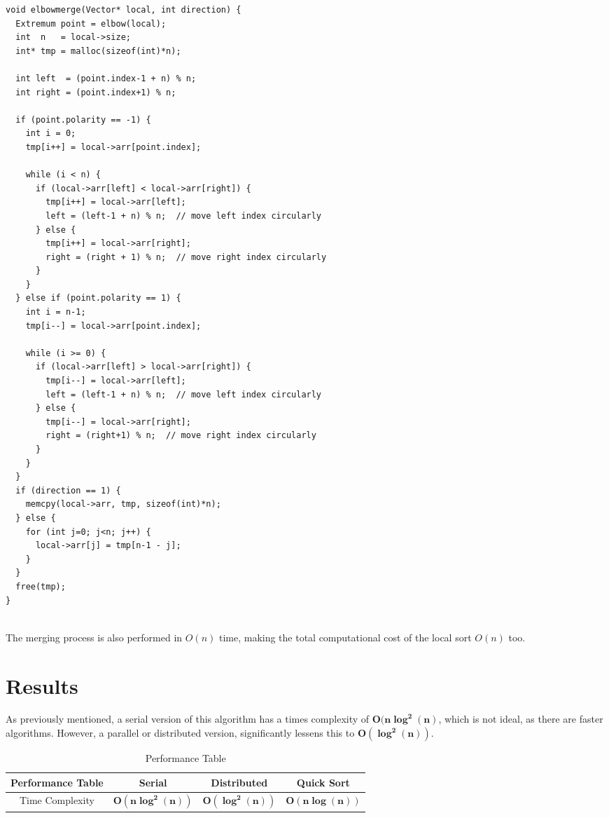 \documentclass[12pt]{report}
\begin{document}
\begin{lstlisting}[style=cstyle]
void elbowmerge(Vector* local, int direction) {
  Extremum point = elbow(local);
  int  n   = local->size;
  int* tmp = malloc(sizeof(int)*n);

  int left  = (point.index-1 + n) % n;
  int right = (point.index+1) % n;

  if (point.polarity == -1) {  
    int i = 0;
    tmp[i++] = local->arr[point.index];  

    while (i < n) {
      if (local->arr[left] < local->arr[right]) {
        tmp[i++] = local->arr[left];
        left = (left-1 + n) % n;  // move left index circularly
      } else {
        tmp[i++] = local->arr[right];
        right = (right + 1) % n;  // move right index circularly
      }
    }
  } else if (point.polarity == 1) {  
    int i = n-1;
    tmp[i--] = local->arr[point.index];  

    while (i >= 0) {
      if (local->arr[left] > local->arr[right]) {
        tmp[i--] = local->arr[left];
        left = (left-1 + n) % n;  // move left index circularly
      } else {
        tmp[i--] = local->arr[right];
        right = (right+1) % n;  // move right index circularly
      }
    }
  }
  if (direction == 1) {
    memcpy(local->arr, tmp, sizeof(int)*n);
  } else {
    for (int j=0; j<n; j++) {
      local->arr[j] = tmp[n-1 - j];
    }
  }
  free(tmp);
}


\end{lstlisting}
The merging process is also performed in $O(n)$ time, making the total computational cost of the local sort $O(n)$ too.

\chapter{Results}
As previously mentioned, a serial version of this algorithm has a times complexity of $\boldsymbol{O(n \log^2(n)}$, which is not ideal, as there are faster algorithms. However, a parallel or distributed version, significantly lessens this to $\boldsymbol{O(\log^2(n))}$.

\begin{table}[h!]
    \centering
    \begin{tabular}{|c|c|c|c|}
        \hline
        \rule{0pt}{3ex}\textbf{Performance Table} & \textbf{Serial}                 & \textbf{Distributed}          & \textbf{Quick Sort}          \\ \hline
        \rule{0pt}{3ex}Time Complexity            & \(\boldsymbol{O(n \log^2(n))}\) & \(\boldsymbol{O(\log^2(n))}\) & \(\boldsymbol{O(n\log(n))}\) \\ \hline
    \end{tabular}
    \caption{Performance Table}
    \label{tab:simple_table}
\end{table}
\end{document}
